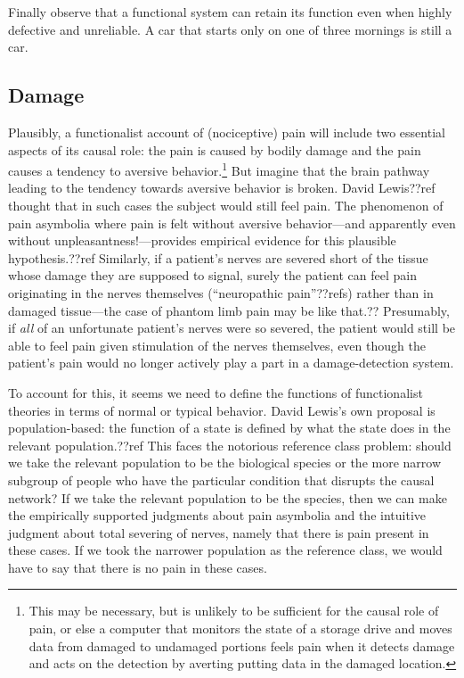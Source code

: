 Finally observe that a functional system can retain its function even when highly defective and unreliable. A car that starts only 
on one of three mornings is still a car. 

\subsection{Damage}
Plausibly, a functionalist account of (nociceptive) pain will include two essential aspects of its causal role: 
the pain is caused by bodily damage and the pain causes a tendency to aversive behavior.\footnote{This may be necessary, but is 
unlikely to be sufficient for the causal role of pain, or else a computer that monitors the state of a storage drive and 
moves data from damaged to undamaged portions feels pain when it detects damage and acts on the detection by averting 
putting data in the damaged location.} But imagine that the brain pathway leading to the tendency towards aversive behavior 
is broken. David Lewis??ref thought that in such cases the subject would still feel pain. The phenomenon of pain asymbolia
where pain is felt without aversive behavior---and apparently even without unpleasantness!---provides empirical evidence 
for this plausible hypothesis.??ref Similarly, if a patient's nerves are severed short of the tissue whose damage they are 
supposed to signal, surely the patient can feel pain originating in the nerves themselves (``neuropathic pain''??refs) rather 
than in damaged tissue---the case of phantom limb pain may be like that.?? Presumably, if \textit{all} of an unfortunate
patient's nerves were so severed, the patient would still be able to feel pain given stimulation of the nerves themselves,
even though the patient's pain would no longer actively play a part in a damage-detection system.

To account for this, it seems we need to define the functions of functionalist theories in terms of normal or typical 
behavior. David Lewis's own proposal is population-based: the function of a state is defined by what the state does in the 
relevant population.??ref This faces the notorious reference class problem: should we take the relevant population to be 
the biological species or the more narrow subgroup of people who have the particular condition that disrupts the causal 
network? If we take the relevant population to be the species, then we can make the empirically supported judgments about 
pain asymbolia and the intuitive judgment about total severing of nerves, namely that there is pain present in these cases.
If we took the narrower population as the reference class, we would have to say that there is no pain in these cases. 

